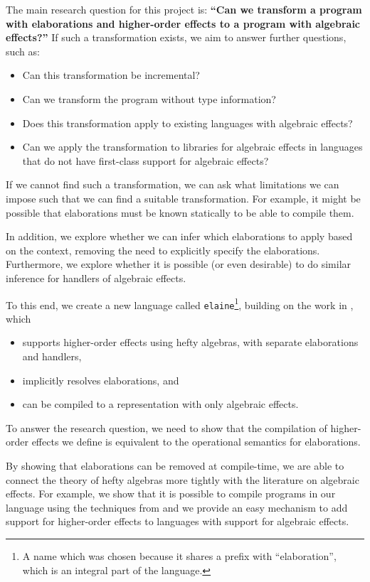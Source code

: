 \documentclass{article}
\begin{document}
The main research question for this project is: \textbf{``Can we transform a program with elaborations and higher-order effects to a program with algebraic effects?''} If such a transformation exists, we aim to answer further questions, such as:
\begin{itemize}
\item Can this transformation be incremental?
\item Can we transform the program without type information?
\item Does this transformation apply to existing languages with algebraic effects?
\item Can we apply the transformation to libraries for algebraic effects in languages that do not have first-class support for algebraic effects?
\end{itemize}

If we cannot find such a transformation, we can ask what limitations we can impose such that we can find a suitable transformation. For example, it might be possible that elaborations must be known statically to be able to compile them.

In addition, we explore whether we can infer which elaborations to apply based on the context, removing the need to explicitly specify the elaborations. Furthermore, we explore whether it is possible (or even desirable) to do similar inference for handlers of algebraic effects.

To this end, we create a new language called \texttt{elaine}\footnote{A name which was chosen because it shares a prefix with ``elaboration'', which is an integral part of the language.}, building on the work in \cite{bach_poulsen_hefty_2023}, which
\begin{itemize}
    \item supports higher-order effects using hefty algebras, with separate elaborations and handlers,
    \item implicitly resolves elaborations, and
    \item can be compiled to a representation with only algebraic effects.
\end{itemize}

To answer the research question, we need to show that the compilation of higher-order effects we define is equivalent to the operational semantics for elaborations.

By showing that elaborations can be removed at compile-time, we are able to connect the theory of hefty algebras more tightly with the literature on algebraic effects. For example, we show that it is possible to compile programs in our language using the techniques from \cite{leijen_type_2017} and we provide an easy mechanism to add support for higher-order effects to languages with support for algebraic effects.
\end{document}
